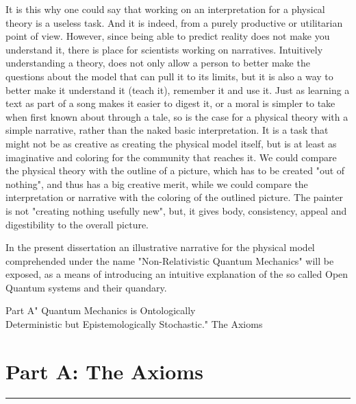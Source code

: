 \documentclass[11pt, a4paper]{article} %
\begin{document}
It is this why one could say that working on an interpretation for a physical theory is a useless task. And it is indeed, from a purely productive or utilitarian point of view. However, since being able to predict reality does not make you understand it, there is place for scientists working on narratives. Intuitively understanding a theory, does not only allow a person to better make the questions about the model that can pull it to its limits, but it is also a way to better make it understand it (teach it), remember it and use it. Just as learning a text as part of a song makes it easier to digest it, or a moral is simpler to take when first known about through a tale, so is the case for a physical theory with a simple narrative, rather than the naked basic interpretation. It is a task that might not be as creative as creating the physical model itself, but is at least as imaginative and coloring for the community that reaches it. We could compare the physical theory with the outline of a picture, which has to be created "out of nothing", and thus has a big creative merit, while we could compare the interpretation or narrative with the coloring of the outlined picture. The painter is not "creating nothing usefully new", but, it gives body, consistency, appeal and digestibility to the overall picture.

In the present dissertation an illustrative narrative for the physical model comprehended under the name "Non-Relativistic Quantum Mechanics" will be exposed, as a means of introducing an intuitive explanation of the so called Open Quantum systems and their quandary. 
\newpage



\newpage


\begin{kapituloBerria}{Part A}{" Quantum Mechanics is Ontologically\\ Deterministic but Epistemologically Stochastic."}
The Axioms 
\end{kapituloBerria}
\newpage
\fancyhead[L]{\null}
\fancyhead[R]{\null}
\null
\clearpage

\section*{\centering \huge{Part A: The Axioms}\vspace{-0.3cm}}
\noindent\rule{\textwidth}{0.4pt}
\end{document}
